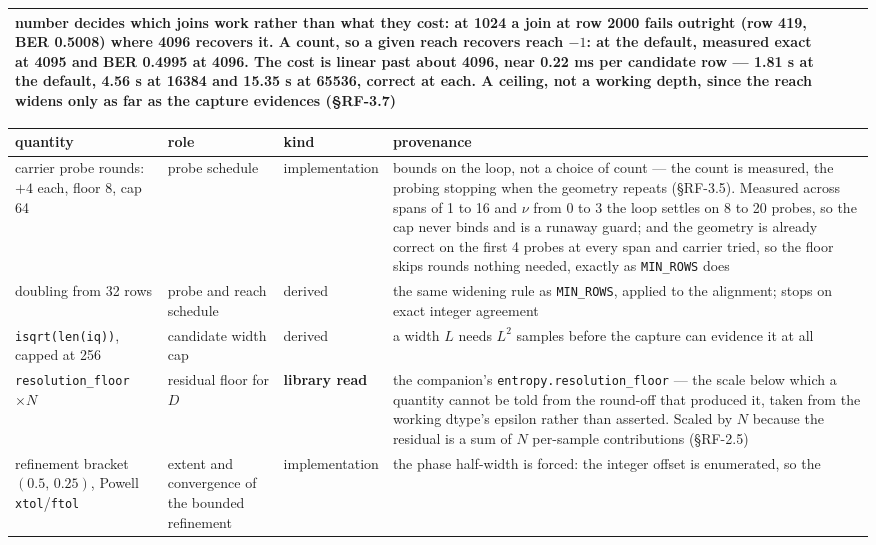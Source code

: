 \documentclass[10pt,letterpaper,twocolumn]{article}
\begin{document}
\begin{table}[tp]
\begin{tabular}{L{0.117\textwidth}L{0.150\textwidth}L{0.117\textwidth}L{0.550\textwidth}}
number decides which joins work rather than what they cost: at 1024 a
join at row 2000 fails outright (row 419, BER 0.5008) where 4096
recovers it. A count, so a given reach recovers reach \(-1\): at the
default, measured exact at 4095 and BER 0.4995 at 4096. The cost is
linear past about 4096, near 0.22 ms per candidate row --- 1.81 s at the
default, 4.56 s at 16384 and 15.35 s at 65536, correct at each. A
ceiling, not a working depth, since the reach widens only as far as the
capture evidences (§RF-3.7) \\
\bottomrule
\end{tabular}
\end{table}
\begin{table}[tp]
\centering\footnotesize
\begin{tabular}{L{0.117\textwidth}L{0.150\textwidth}L{0.117\textwidth}L{0.550\textwidth}}
\toprule
quantity & role & kind & provenance \\
\midrule
carrier probe rounds: \(+4\) each, floor 8, cap 64 & probe schedule & implementation & bounds on the loop, not a choice of count --- the count is measured, the
probing stopping when the geometry repeats (§RF-3.5). Measured across
spans of 1 to 16 and \(\nu\) from 0 to 3 the loop settles on 8 to 20
probes, so the cap never binds and is a runaway guard; and the geometry
is already correct on the first 4 probes at every span and carrier
tried, so the floor skips rounds nothing needed, exactly as
\texttt{MIN\_\allowbreak{}ROWS} does \\
doubling from 32 rows & probe and reach schedule & derived & the same widening rule as \texttt{MIN\_\allowbreak{}ROWS}, applied to
the alignment; stops on exact integer agreement \\
\texttt{isqrt(\allowbreak{}len(\allowbreak{}iq)\allowbreak{})\allowbreak{}},
capped at 256 & candidate width cap & derived & a width \(L\) needs \(L^2\) samples before the capture can evidence it
at all \\
\texttt{resolution\_\allowbreak{}floor} \(\times N\) & residual floor for \(D\) & \textbf{library read} & the companion's
\texttt{entropy.\allowbreak{}resolution\_\allowbreak{}floor} --- the
scale below which a quantity cannot be told from the round-off that
produced it, taken from the working dtype's epsilon rather than
asserted. Scaled by \(N\) because the residual is a sum of \(N\)
per-sample contributions (§RF-2.5) \\
refinement bracket \((0.5,\,0.25)\), Powell \texttt{xtol}/\texttt{ftol} & extent and convergence of the bounded refinement & implementation & the phase half-width is forced: the integer offset is enumerated, so the

\end{tabular}
\end{table}
\end{document}
